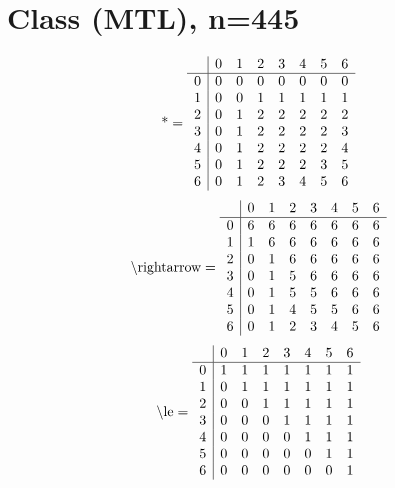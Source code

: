 \documentclass[11pt]{article}
\begin{document}
\section{Class (MTL), n=445}
\[\text{*} = 
\begin{array}{r | r r r r r r r}
 & 0 & 1 & 2 & 3 & 4 & 5 & 6 \\ \hline
0 & 0 & 0 & 0 & 0 & 0 & 0 & 0 \\
1 & 0 & 0 & 1 & 1 & 1 & 1 & 1 \\
2 & 0 & 1 & 2 & 2 & 2 & 2 & 2 \\
3 & 0 & 1 & 2 & 2 & 2 & 2 & 3 \\
4 & 0 & 1 & 2 & 2 & 2 & 2 & 4 \\
5 & 0 & 1 & 2 & 2 & 2 & 3 & 5 \\
6 & 0 & 1 & 2 & 3 & 4 & 5 & 6 \\
\end{array}
\]
\[\text{\textbackslash rightarrow} = 
\begin{array}{r | r r r r r r r}
 & 0 & 1 & 2 & 3 & 4 & 5 & 6 \\ \hline
0 & 6 & 6 & 6 & 6 & 6 & 6 & 6 \\
1 & 1 & 6 & 6 & 6 & 6 & 6 & 6 \\
2 & 0 & 1 & 6 & 6 & 6 & 6 & 6 \\
3 & 0 & 1 & 5 & 6 & 6 & 6 & 6 \\
4 & 0 & 1 & 5 & 5 & 6 & 6 & 6 \\
5 & 0 & 1 & 4 & 5 & 5 & 6 & 6 \\
6 & 0 & 1 & 2 & 3 & 4 & 5 & 6 \\
\end{array}
\]
\[\text{\textbackslash le} = 
\begin{array}{r | r r r r r r r}
 & 0 & 1 & 2 & 3 & 4 & 5 & 6 \\ \hline
0 & 1 & 1 & 1 & 1 & 1 & 1 & 1 \\
1 & 0 & 1 & 1 & 1 & 1 & 1 & 1 \\
2 & 0 & 0 & 1 & 1 & 1 & 1 & 1 \\
3 & 0 & 0 & 0 & 1 & 1 & 1 & 1 \\
4 & 0 & 0 & 0 & 0 & 1 & 1 & 1 \\
5 & 0 & 0 & 0 & 0 & 0 & 1 & 1 \\
6 & 0 & 0 & 0 & 0 & 0 & 0 & 1 \\
\end{array}
\]
\end{document}
